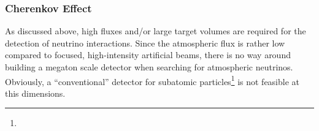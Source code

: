 \subsubsection{Cherenkov Effect}

As discussed above, high fluxes and/or large target volumes are required for 
the detection of neutrino interactions. Since the atmospheric flux is rather 
low compared to focused, high-intensity artificial beams, there is no way 
around building a megaton scale detector when searching for atmospheric 
neutrinos. Obviously, a ``conventional'' detector for subatomic 
particles\footnote{} is not feasible at this dimensions.